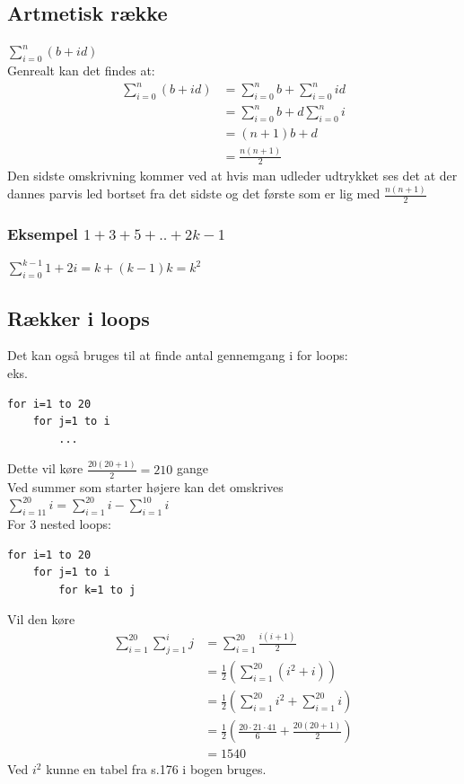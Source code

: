\documentclass[12pt, a4paper]{article}
\begin{document}
	\subsection{Artmetisk række}
		$\sum\limits_{i=0}^n(b+id)$\\
		Genrealt kan det findes at:
		\begin{align*}
			\sum\limits_{i=0}^n(b+id)&=\sum\limits_{i=0}^nb+\sum\limits_{i=0}^nid\\
						 &=\sum\limits_{i=0}^nb+d\sum_{i=0}^ni\\
						 &=(n+1)b+d\\
						 &=\frac{n(n+1)}{2}
		\end{align*}
		Den sidste omskrivning kommer ved at hvis man udleder udtrykket ses det at der dannes parvis led bortset fra det sidste og det første som er lig med $\frac{n(n+1)}{2}$
		\subsubsection{Eksempel $1+3+5+..+2k-1$}
			$\sum\limits_{i=0}^{k-1}1+2i=k+(k-1)k=k^2$
	\subsection{Rækker i loops}
		Det kan også bruges til at finde antal gennemgang i for loops:\\
		eks. 
		\begin{lstlisting}
for i=1 to 20
	for j=1 to i
		...
		\end{lstlisting}
		Dette vil køre $\frac{20(20+1)}{2}=210$ gange\\
		Ved summer som starter højere kan det omskrives\\
		$\sum\limits_{i=11}^{20}i=\sum\limits_{i=1}^{20}i-\sum\limits_{i=1}^{10}i$\\
		For 3 nested loops:
		\begin{lstlisting}
for i=1 to 20
	for j=1 to i
		for k=1 to j
		\end{lstlisting}
		Vil den køre 
		\begin{align*}
			\sum\limits_{i=1}^{20}\sum\limits_{j=1}^ij&=\sum\limits_{i=1}^{20}\frac{i(i+1)}{2}\\
								  &=\frac{1}{2}(\sum\limits_{i=1}^{20}(i^2+i))\\
								  &=\frac{1}{2}(\sum\limits_{i=1}^{20}i^2+\sum\limits_{i=1}^{20}i)\\
								  &=\frac{1}{2}(\frac{20\cdot 21\cdot 41}{6}+\frac{20(20+1)}{2})\\
								  &=1540
		\end{align*}
		Ved $i^2$ kunne en tabel fra s.176 i bogen bruges.
\end{document}
